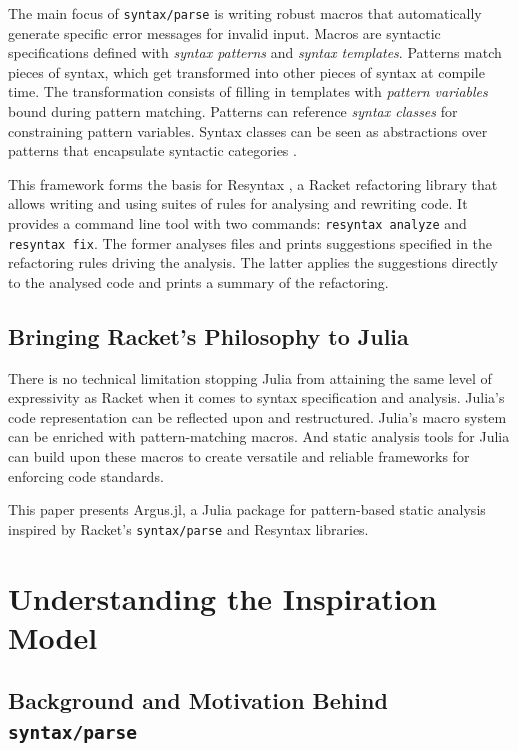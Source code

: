 \documentclass{juliacon}
\begin{document}
The main focus of \texttt{syntax/parse} is writing robust macros that
automatically generate specific error messages for invalid
input. Macros are syntactic specifications defined with \emph{syntax
patterns} and \emph{syntax templates}. Patterns match pieces of syntax,
which get transformed into other pieces of syntax at compile time. The
transformation consists of filling in templates with \emph{pattern
variables} bound during pattern matching. Patterns can reference
\emph{syntax classes} for constraining pattern variables. Syntax classes
can be seen as abstractions over patterns that encapsulate syntactic
categories \cite{syntax_class}.

This framework forms the basis for Resyntax \cite{resyntax}, a Racket
refactoring library that allows writing and using suites of rules for
analysing and rewriting code. It provides a command line tool with two
commands: \texttt{resyntax analyze} and \texttt{resyntax fix}. The former analyses
files and prints suggestions specified in the refactoring rules
driving the analysis. The latter applies the suggestions directly to
the analysed code and prints a summary of the refactoring.

\subsection{Bringing Racket's Philosophy to Julia}
\label{sec:org2397f8a}

There is no technical limitation stopping Julia from attaining the
same level of expressivity as Racket when it comes to syntax
specification and analysis. Julia's code representation can be
reflected upon and restructured. Julia's macro system can be enriched
with pattern-matching macros. And static analysis tools for Julia can
build upon these macros to create versatile and reliable frameworks
for enforcing code standards.

This paper presents Argus.jl, a Julia package for pattern-based static
analysis inspired by Racket's \texttt{syntax/parse} and Resyntax libraries.

\section{Understanding the Inspiration Model}
\label{sec:orga631655}

\subsection{Background and Motivation Behind \texttt{syntax/parse}}
\label{sec:org0a134f1}
\end{document}
